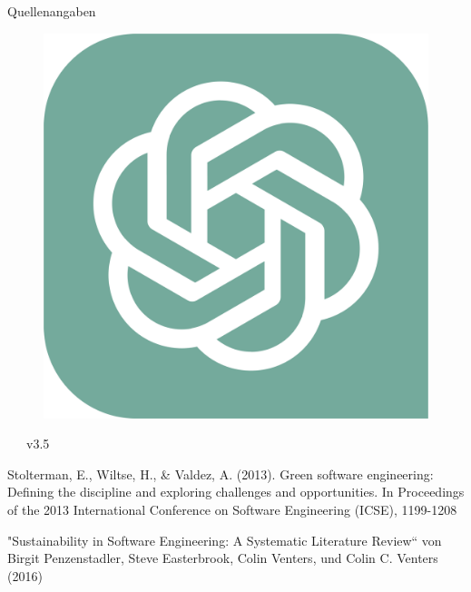 \documentclass[10pt,aspectratio=169]{beamer}
\begin{document}
\begin{frame}{Quellenangaben}
\begin{minipage}{0.05\linewidth}
\begin{figure}[!ht]
            \includegraphics[width=\linewidth]{assets/ChatGPT_logo.pdf}
        \end{figure}
        \vspace{-2mm}
        ~~~v3.5
        \vspace{1.4cm}
\end{minipage}
\begin{minipage}{0.43\linewidth}
    \small
    \begin{framed}
        Stolterman, E., Wiltse, H., \& Valdez, A. (2013). Green software engineering: Defining the discipline and exploring challenges and opportunities. In Proceedings of the 2013 International Conference on Software Engineering (ICSE), 1199-1208
    \end{framed}
    \vspace{0.3cm}
    \begin{framed}
        "Sustainability in Software Engineering: A Systematic Literature Review“ von Birgit Penzenstadler, Steve Easterbrook, Colin Venters, und Colin C. Venters (2016)
    \end{framed}
\end{minipage}
\end{frame}
\end{document}
